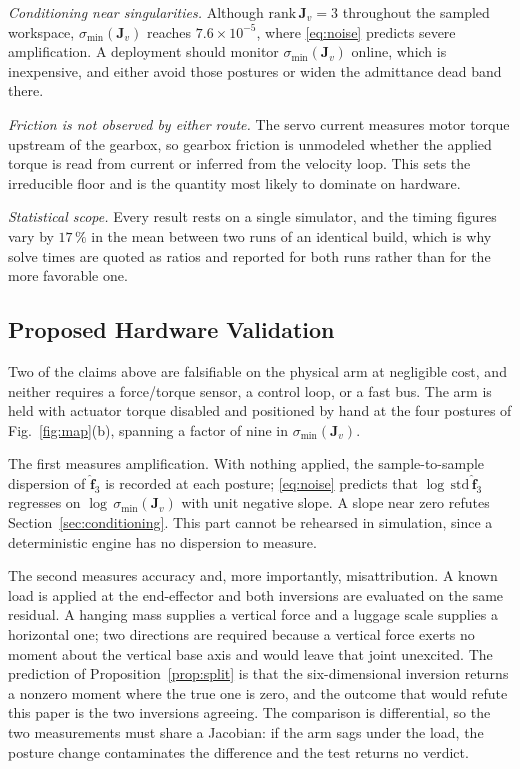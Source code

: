 \documentclass{ieeeaccess}
\newcommand{\Jv}{\bm{J}_{\!v}}
\begin{document}
\emph{Conditioning near singularities.} Although $\mathrm{rank}\,\Jv=3$ throughout
the sampled workspace, $\sigma_{\min}(\Jv)$ reaches $7.6\times10^{-5}$, where
\eqref{eq:noise} predicts severe amplification. A deployment should monitor
$\sigma_{\min}(\Jv)$ online, which is inexpensive, and either avoid those postures
or widen the admittance dead band there.

\emph{Friction is not observed by either route.} The servo current measures motor
torque upstream of the gearbox, so gearbox friction is unmodeled whether the
applied torque is read from current or inferred from the velocity loop. This sets
the irreducible floor and is the quantity most likely to dominate on hardware.

\emph{Statistical scope.} Every result rests on a single simulator, and the
timing figures vary by $17\,\%$ in the mean between two runs of an identical
build, which is why solve times are quoted as ratios and reported for both runs
rather than for the more favorable one.

\subsection{Proposed Hardware Validation}
\label{sec:protocol}
Two of the claims above are falsifiable on the physical arm at negligible cost,
and neither requires a force/torque sensor, a control loop, or a fast bus. The arm
is held with actuator torque disabled and positioned by hand at the four postures
of Fig.~\ref{fig:map}(b), spanning a factor of nine in $\sigma_{\min}(\Jv)$.

The first measures amplification. With nothing applied, the sample-to-sample
dispersion of $\hat{\bm f}_3$ is recorded at each posture; \eqref{eq:noise}
predicts that $\log\,\mathrm{std}\,\hat{\bm f}_3$ regresses on
$\log\,\sigma_{\min}(\Jv)$ with unit negative slope. A slope near zero refutes
Section~\ref{sec:conditioning}. This part cannot be rehearsed in simulation, since
a deterministic engine has no dispersion to measure.

The second measures accuracy and, more importantly, misattribution. A known load
is applied at the end-effector and both inversions are evaluated on the same
residual. A hanging mass supplies a vertical force and a luggage scale supplies a
horizontal one; two directions are required because a vertical force exerts no
moment about the vertical base axis and would leave that joint unexcited. The
prediction of Proposition~\ref{prop:split} is that the six-dimensional inversion
returns a nonzero moment where the true one is zero, and the outcome that would
refute this paper is the two inversions agreeing. The comparison is differential,
so the two measurements must share a Jacobian: if the arm sags under the load, the
posture change contaminates the difference and the test returns no verdict.
\end{document}
